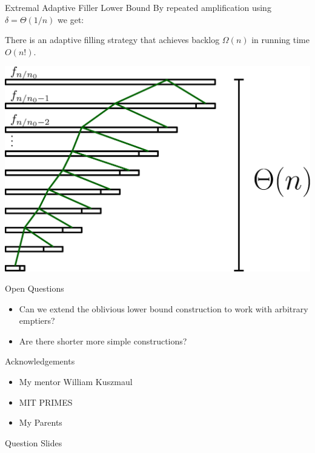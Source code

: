 \documentclass[xcolor=x11names, svgnames, rgb]{beamer}
\begin{document}
\begin{frame}[t]{Extremal Adaptive Filler Lower Bound}
  By repeated amplification using $\delta=\Theta(1/n)$ we get: 
  \begin{theorem}
    There is an adaptive filling strategy that
    achieves backlog $\Omega(n)$ in running time $O(n!)$.
  \end{theorem}
  \begin{center}
  \includegraphics[width=0.65\linewidth]{amplificationImgs/expo_cor.eps}
  \end{center}
\end{frame}

\begin{frame}[t]{Open Questions}
  \begin{itemize}
    \item Can we extend the oblivious lower bound construction to work with arbitrary emptiers?
    \item Are there shorter more simple constructions?
  \end{itemize}
\end{frame}

\begin{frame}[t]{Acknowledgements}
  \begin{itemize}
    \item My mentor William Kuszmaul
    \item MIT PRIMES
    \item My Parents
 \end{itemize} 
\end{frame}

\begin{frame}[c]{}
\begin{center}
\Huge Question Slides
\end{center}
\end{frame}
\end{document}
